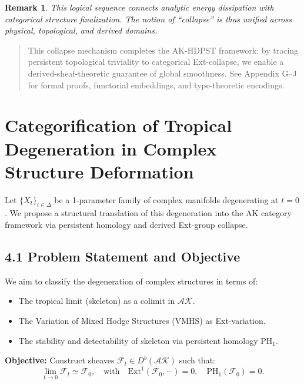 \documentclass[11pt]{article}
\newtheorem{remark}[theorem]{Remark}
\begin{document}
\begin{remark}
This logical sequence connects analytic energy dissipation with categorical structure finalization. The notion of “collapse” is thus unified across physical, topological, and derived domains.
\end{remark}

\begin{quote}
This collapse mechanism completes the AK-HDPST framework:  
by tracing persistent topological triviality to categorical Ext-collapse,  
we enable a derived-sheaf-theoretic guarantee of global smoothness.  
See Appendix G–J for formal proofs, functorial embeddings, and type-theoretic encodings.
\end{quote}





\section{Categorification of Tropical Degeneration in Complex Structure Deformation}

Let \( \{X_t\}_{t \in \Delta} \) be a 1-parameter family of complex manifolds degenerating at \( t=0 \).  
We propose a structural translation of this degeneration into the AK category framework via persistent homology and derived Ext-group collapse.

\subsection{4.1 Problem Statement and Objective}

We aim to classify the degeneration of complex structures in terms of:

\begin{itemize}
    \item The tropical limit (skeleton) as a colimit in \( \mathcal{AK} \).
    \item The Variation of Mixed Hodge Structures (VMHS) as Ext-variation.
    \item The stability and detectability of skeleton via persistent homology \( \mathrm{PH}_1 \).
\end{itemize}

\textbf{Objective:} Construct sheaves \( \mathcal{F}_t \in D^b(\mathcal{AK}) \) such that:
\[
\lim_{t \to 0} \mathcal{F}_t \simeq \mathcal{F}_0, \quad \text{with} \quad \mathrm{Ext}^1(\mathcal{F}_0, -) = 0, \quad \mathrm{PH}_1(\mathcal{F}_0) = 0.
\]
\end{document}
